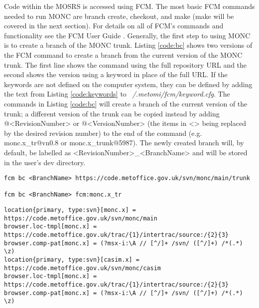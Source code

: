 Code within the MOSRS is accessed using FCM. The most basic FCM commands needed to run MONC are branch create, checkout, and make (make will be covered in the next section). For details on all of FCM's commands and functionality see the FCM User Guide \citep{fcm}. Generally, the first step to using MONC is to create a branch of the MONC trunk. Listing \ref{code:bc} shows two versions of the FCM command to create a branch from the current version of the MONC trunk. The first line shows the command using the full repository URL and the second shows the version using a keyword in place of the full URL. If the keywords are not defined on the computer system, they can be defined by adding the text from Listing \ref{code:keywords} to \textit{~/.metomi/fcm/keyword.cfg}. The commands in Listing \ref{code:bc} will create a branch of the current version of the trunk; a different version of the trunk can be copied instead by adding @<RevisionNumber> or @<VersionNumber> (the items in <> being replaced by the desired revision number) to the end of the command (e.g. monc.x\_tr@vn0.8 or monc.x\_trunk@5987). The newly created branch will, by default, be labelled as <RevisionNumber>\_<BranchName> and will be stored in the user's dev directory. \citep{moncGuides}

\begin{lstlisting}[caption=Example of FCM command to create a branch of the current version of the MONC trunk. Both commands produce the same results the only difference is that the second uses a keyword in place of the full URL. In each case <BranchName> would be replaced by the desired name for the branch,label={code:bc}]
fcm bc <BranchName> https://code.metoffice.gov.uk/svn/monc/main/trunk

fcm bc <BranchName> fcm:monc.x_tr
\end{lstlisting}

\begin{lstlisting}[caption=Definition of MONC and CASIM FCM keywords. Can be added to ~/.metomi/fcm/keyword.cfg so that keywords can be used in FCM commands in place of full URLs.,label={code:keywords}]
location{primary, type:svn}[monc.x] = https://code.metoffice.gov.uk/svn/monc/main
browser.loc-tmpl[monc.x] = https://code.metoffice.gov.uk/trac/{1}/intertrac/source:/{2}{3}
browser.comp-pat[monc.x] = (?msx-i:\A // [^/]+ /svn/ ([^/]+) /*(.*) \z)
location{primary, type:svn}[casim.x] = https://code.metoffice.gov.uk/svn/monc/casim
browser.loc-tmpl[monc.x] = https://code.metoffice.gov.uk/trac/{1}/intertrac/source:/{2}{3}
browser.comp-pat[monc.x] = (?msx-i:\A // [^/]+ /svn/ ([^/]+) /*(.*) \z)
\end{lstlisting}

